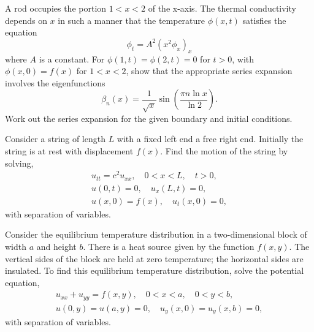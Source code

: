 {%
\begin{Exercise}
  \label{exercise pt=A2x2pxx}
  A rod occupies the portion $1 < x < 2$ of 
  the x-axis. The thermal conductivity depends on $x$ in such a manner that
  the temperature $\phi(x,t)$ satisfies the equation
  \begin{equation}
    \label{phi_t=A^2x^2phi_x_x}
    \phi_t = A^2(x^2 \phi_x)_x
  \end{equation}
  where $A$ is a  constant. For $\phi(1,t) = \phi(2,t) = 0$ for $t > 0$,
  with $\phi(x,0) = f(x)$ for  $1 < x < 2$, show that the appropriate series
  expansion involves the eigenfunctions
  \[
  \beta_n(x) = \frac{1}{\sqrt{x}} \sin \left( \frac{\pi n \ln x}{\ln 2}
  \right ).
  \]
  Work out the series expansion for the given boundary and initial conditions.

\end{Exercise}






\begin{Exercise}
  \label{exercise wave fixed free end zero}
  Consider a string of length $L$ with a fixed left end a free right end.
  Initially the string is at rest with displacement $f(x)$.  Find the 
  motion of the string by solving,
  \begin{gather*}
    u_{t t} = c^2 u_{x x}, \quad 0 < x < L, \quad t > 0, \\
    u(0,t) = 0, \quad u_x(L,t) = 0, \\
    u(x,0) = f(x), \quad u_t(x,0) = 0,
  \end{gather*}
  with separation of variables.

\end{Exercise}





\begin{Exercise}
  \label{exercise potential 2d block zero insulated}
  Consider the equilibrium temperature distribution in a two-dimensional 
  block of width $a$ and height $b$.  There is a heat source given by the 
  function $f(x,y)$.  The vertical sides of the block are held at zero 
  temperature; the horizontal sides are insulated.
  To find this equilibrium temperature distribution, solve the potential 
  equation,
  \begin{gather*}
    u_{x x} + u_{y y} = f(x, y), \quad 0 < x < a, \quad 0 < y < b, \\
    u(0,y) = u(a,y) = 0, \quad u_y(x,0) = u_y(x,b) = 0,
  \end{gather*}
  with separation of variables.


\end{Exercise}}
